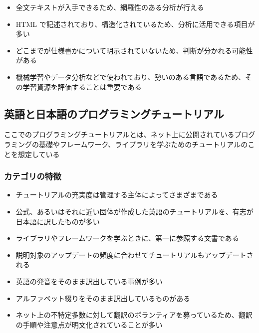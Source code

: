 \begin{itemize}
\tightlist
\item
  全文テキストが入手できるため、網羅性のある分析が行える
\item
  HTML
  で記述されており、構造化されているため、分析に活用できる項目が多い
\item
  どこまでが仕様書かについて明示されていないため、判断が分かれる可能性がある
\item
  機械学習やデータ分析などで使われており、勢いのある言語であるため、その学習資源を評価することは重要である
\end{itemize}

\hypertarget{ux82f1ux8a9eux3068ux65e5ux672cux8a9eux306eux30d7ux30edux30b0ux30e9ux30dfux30f3ux30b0ux30c1ux30e5ux30fcux30c8ux30eaux30a2ux30eb}{%
\subsection{英語と日本語のプログラミングチュートリアル}\label{ux82f1ux8a9eux3068ux65e5ux672cux8a9eux306eux30d7ux30edux30b0ux30e9ux30dfux30f3ux30b0ux30c1ux30e5ux30fcux30c8ux30eaux30a2ux30eb}}

ここでのプログラミングチュートリアルとは、ネット上に公開されているプログラミングの基礎やフレームワーク、ライブラリを学ぶためのチュートリアルのことを想定している

\hypertarget{ux30abux30c6ux30b4ux30eaux306eux7279ux5fb4-2}{%
\subsubsection{カテゴリの特徴}\label{ux30abux30c6ux30b4ux30eaux306eux7279ux5fb4-2}}

\begin{itemize}
\tightlist
\item
  チュートリアルの充実度は管理する主体によってさまざまである
\item
  公式、あるいはそれに近い団体が作成した英語のチュートリアルを、有志が日本語に訳したものが多い
\item
  ライブラリやフレームワークを学ぶときに、第一に参照する文書である
\item
  説明対象のアップデートの頻度に合わせてチュートリアルもアップデートされる
\item
  英語の発音をそのまま訳出している事例が多い
\item
  アルファベット綴りをそのまま訳出しているものがある
\item
  ネット上の不特定多数に対して翻訳のボランティアを募っているため、翻訳の手順や注意点が明文化されていることが多い
\end{itemize}


